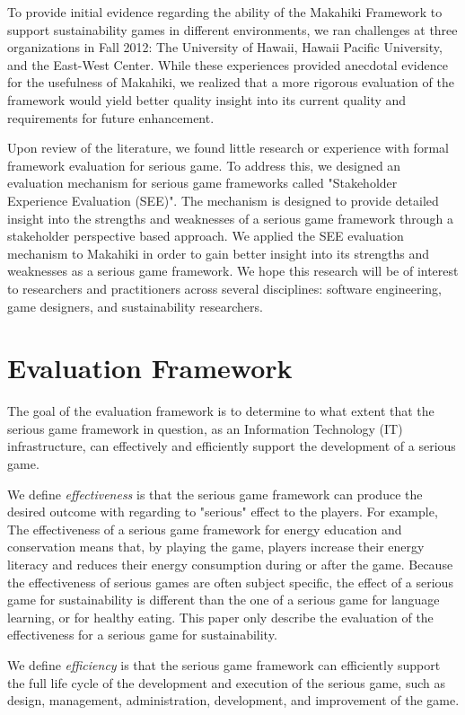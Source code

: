 \documentclass{sigchi}
\begin{document}
To provide initial evidence regarding the ability of the Makahiki Framework to support sustainability games in different environments, we ran challenges at three organizations in Fall 2012: The University of Hawaii, Hawaii Pacific University, and the East-West Center. While these experiences provided anecdotal evidence for the usefulness of Makahiki, we realized that a more rigorous evaluation of the framework would yield better quality insight into its current quality and requirements for future enhancement.

Upon review of the literature, we found little research or experience with formal framework evaluation for serious game. To address this, we designed an evaluation mechanism for serious game frameworks called "Stakeholder Experience Evaluation (SEE)". The mechanism is designed to provide detailed insight into the strengths and weaknesses of a serious game framework through a stakeholder perspective based approach. We applied the SEE evaluation mechanism to Makahiki in order to gain better insight into its strengths and weaknesses as a serious game framework. We hope this research will be of interest to researchers and practitioners across several disciplines: software engineering, game designers, and sustainability researchers.

\section{Evaluation Framework}

The goal of the evaluation framework is to determine to what extent that the serious game framework in question, as an Information Technology (IT) infrastructure, can effectively and efficiently support the development of a serious game.

We define \emph{effectiveness} is that the serious game framework can produce the desired outcome with regarding to "serious" effect to the players. For example, The effectiveness of a serious game framework for energy education and conservation means that, by playing the game, players increase their energy literacy and reduces their energy consumption during or after the game. Because the effectiveness of serious games are often subject specific, the effect of a serious game for sustainability is different than the one of a serious game for language learning, or for healthy eating. This paper only describe the evaluation of the effectiveness for a serious game for sustainability.

We define \emph{efficiency} is that the serious game framework can efficiently support the full life cycle of the development and execution of the serious game, such as design, management, administration, development, and improvement of the game.
\end{document}
